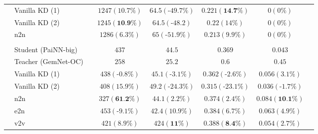 \documentclass{article}
\begin{document}
\begin{table}[H]
\begin{tabular}{llcccccc}
& Vanilla KD (1)             &   &            $1247 (10.7\%)$          &          $64.5 (\text{-}49.7\%)$     &     $0.221 (\textbf{14.7\%})$        &  $0 (0\%)$ \\
& Vanilla KD (2)               &   &            $1245 (\textbf{10.9\%})$          &          $64.5 (\text{-}48.2)$     &     $0.22 (14\%)$        &  $0 (0\%)$ &  \\
& n2n              &   &            $1286 (6.3\%)$          &          $65 (\text{-}51.9\%)$     &     $0.213 (9.9\%)$        &  $0 (0\%)$  &  \\
\multicolumn{7}{c}{} \\
\parbox[t]{2mm}{} & Student (PaiNN-big)                  &   &              $437$        &   $44.5$     &   $0.369$      &   $0.043$    \\
& Teacher (GemNet-OC)                      &   &              $258$        &   $25.2$     &   $0.6$      &   $0.45$     \\
& Vanilla KD (1)           &   &            $438 (\text{-}0.8\%)$          &          $45.1 (\text{-}3.1\%)$     &     $0.362 (\text{-}2.6\%)$        &  $0.056 (3.1\%)$    \\
& Vanilla KD (2)             &   &            $408 (15.9\%)$          &          $49.2 (\text{-}24.3\%)$     &     $0.315 (\text{-}23.1\%)$        &  $0.036 (\text{-}1.7\%)$   \\
& n2n              &   &            $327 (\textbf{61.2\%})$          &          $44.1 (2.2\%)$     &     $0.374 (2.4\%)$        &  $0.084 (\textbf{10.1\%})$   \\
& e2n               &   &            $453 (\text{-}9.1\%)$          &          $42.4 (10.9\%)$     &     $0.384 (6.7\%)$        &  $0.063 (4.9\%)$     \\
& v2v              &   &            $421 (8.9\%)$          &          $424 (\textbf{11\%})$     &     $0.388 (\textbf{8.4\%})$        &  $0.054 (2.7\%)$        
\end{tabular}
\label{tab:ood_ads_results}
\end{table}
\end{document}
